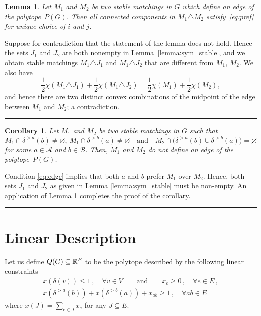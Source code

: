 \documentclass[3p,times]{elsarticle}
\newtheorem{lemma}[fact]{Lemma}
\newtheorem{corollary}[fact]{Corollary}
\newenvironment{proof}{{\bf Proof:  }}{\hfill\rule{2mm}{2mm}}
\begin{document}
\begin{lemma}\label{lemma:edge}
  Let $M_1$ and $M_2$ be two stable matchings in $G$ which define an
  edge of the polytope~$P(G)$. 
  Then all connected components in
  $M_1\triangle M_2$ satisfy~\eqref{eq:pref} for unique choice of $i$
  and $j$. 
\end{lemma}
\begin{proof}
  Suppose for contradiction that the statement of the lemma does not
  hold. Hence the sets $J_1$ and $J_2$ are both nonempty in
  Lemma~\ref{lemma:sym_stable}, and we obtain stable matchings
  $M_1\triangle J_1$ and $M_1\triangle J_2$ that are different from $M_1$,
  $M_2$. 
  We also have 
  \[ \frac{1}{2}\chi(M_1\triangle J_1)+\frac{1}{2}\chi(M_1\triangle
  J_2) =\frac{1}{2}\chi(M_1)+\frac{1}{2}\chi(M_2),\]
  and hence there are two distinct convex combinations of the midpoint
  of the edge between $M_1$ and $M_2$; a contradiction. 
\end{proof}


\begin{corollary}\label{cor:edge}
Let $M_1$ and $M_2$ be two stable matchings in $G$ such that
\begin{equation}\label{eq:edge}
M_1\cap\delta^{>a}(b)\neq\varnothing,\
M_1\cap\delta^{>b}(a)\neq\varnothing\quad\text{and}\quad
M_2\cap\big(\delta^{>a}(b)\cup \delta^{>b}(a)\big)=\varnothing
\end{equation}
 for some $a\in\mathcal{A}$ and $b\in\mathcal{B}$. Then, $M_1$ and $M_2$ do not define an edge of the polytope~$P(G)$.
\end{corollary}
\begin{proof}
  Condition \eqref{eq:edge} implies that both $a$ and $b$ prefer
  $M_1$ over $M_2$. Hence, both sets $J_1$ and $J_2$ as given in Lemma
  \ref{lemma:sym_stable} must be non-empty. An application of Lemma
  \ref{lemma:edge} completes the proof of the corollary.
\end{proof}


\section{Linear Description}
Let us define $Q(G)\subseteq\mathbb{R}^E$ to be the polytope described by the
following linear constraints
\begin{align}
  x(\delta(v)) \leq 1\,,\quad \forall v \in V\qquad \text{and} \qquad x_e \geq 0\,,\quad \forall e \in E\,,\label{eq:lin_descr_match}\\
  x(\delta^{>a}(b))+ x(\delta^{>b}(a)) + x_{ab} \geq 1\,, \quad \forall ab \in E \label{eq:lin_descr_stab}
\end{align}
where $x(J) = \sum_{e \in J} x_e$ for any $J \subseteq E$.
\end{document}
